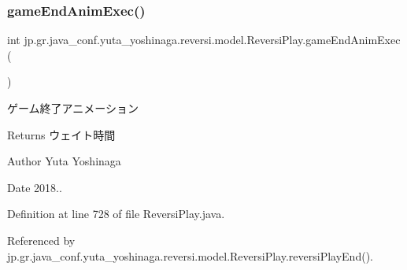 \subsubsection{\texorpdfstring{game\+End\+Anim\+Exec()}{gameEndAnimExec()}}
{\footnotesize\ttfamily int jp.\+gr.\+java\+\_\+conf.\+yuta\+\_\+yoshinaga.\+reversi.\+model.\+Reversi\+Play.\+game\+End\+Anim\+Exec (\begin{DoxyParamCaption}{ }\end{DoxyParamCaption})}



ゲーム終了アニメーション 

\begin{DoxyReturn}{Returns}
ウェイト時間 
\end{DoxyReturn}
\begin{DoxyAuthor}{Author}
Yuta Yoshinaga 
\end{DoxyAuthor}
\begin{DoxyDate}{Date}
2018.. 
\end{DoxyDate}


Definition at line 728 of file Reversi\+Play.\+java.



Referenced by jp.\+gr.\+java\+\_\+conf.\+yuta\+\_\+yoshinaga.\+reversi.\+model.\+Reversi\+Play.\+reversi\+Play\+End().


